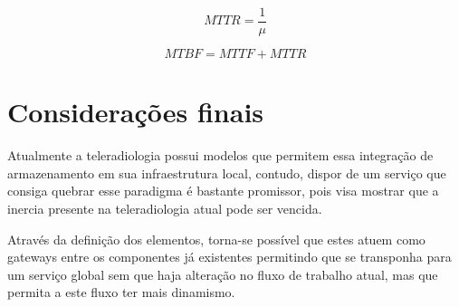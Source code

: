 \documentclass[conference]{IEEEtran}
\begin{document}
\begin{equation}
\label{equacao:MTTR}
MTTR = \frac{1}{\mu}
\end{equation}

\begin{equation}
\label{equacao:MTBF}
MTBF = MTTF + MTTR
\end{equation}

\section{Considerações finais}

Atualmente a teleradiologia possui modelos que permitem essa integração de armazenamento em sua infraestrutura local, contudo, dispor de um serviço que consiga quebrar esse paradigma é bastante promissor, pois visa mostrar que a inercia presente na teleradiologia atual pode ser vencida.

Através da definição dos elementos, torna-se possível que estes atuem como gateways entre os componentes já existentes permitindo que se transponha para um serviço global sem que haja alteração no fluxo de trabalho atual, mas que permita a este fluxo ter mais dinamismo.

\addtolength{\textheight}{-12cm}   %


  

\end{document}
